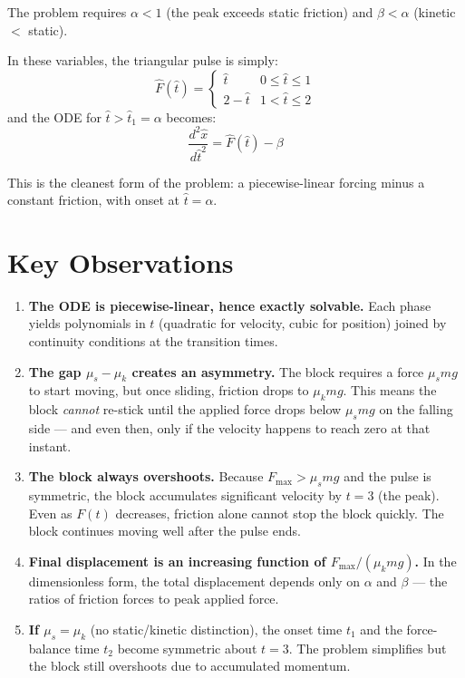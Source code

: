 \documentclass[11pt]{article}
\newcommand{\ddd}[2]{\frac{d^2 #1}{d #2^2}}
\begin{document}
\noindent
The problem requires $\alpha < 1$ (the peak exceeds static friction) and $\beta < \alpha$ (kinetic $<$ static).

\medskip
\noindent
In these variables, the triangular pulse is simply:
\begin{equation}
\hat{F}(\hat{t}) =
\begin{cases}
\hat{t} & 0 \le \hat{t} \le 1 \\
2 - \hat{t} & 1 < \hat{t} \le 2
\end{cases}
\end{equation}
and the ODE for $\hat{t} > \hat{t}_1 = \alpha$ becomes:
\begin{equation}
\boxed{\ddd{\hat{x}}{\hat{t}} = \hat{F}(\hat{t}) - \beta}
\label{eq:dimless_ode}
\end{equation}

\noindent
This is the cleanest form of the problem: a piecewise-linear forcing minus a constant friction, with onset at $\hat{t} = \alpha$.

\section{Key Observations}

\begin{enumerate}
    \item \textbf{The ODE is piecewise-linear, hence exactly solvable.}  Each phase yields polynomials in $t$ (quadratic for velocity, cubic for position) joined by continuity conditions at the transition times.

    \item \textbf{The gap $\mu_s - \mu_k$ creates an asymmetry.}  The block requires a force $\mu_s mg$ to start moving, but once sliding, friction drops to $\mu_k mg$.  This means the block \emph{cannot} re-stick until the applied force drops below $\mu_s mg$ on the falling side --- and even then, only if the velocity happens to reach zero at that instant.

    \item \textbf{The block always overshoots.}  Because $F_{\max} > \mu_s mg$ and the pulse is symmetric, the block accumulates significant velocity by $t = 3$ (the peak).  Even as $F(t)$ decreases, friction alone cannot stop the block quickly.  The block continues moving well after the pulse ends.

    \item \textbf{Final displacement is an increasing function of $F_{\max}/(\mu_k mg)$.}  In the dimensionless form, the total displacement depends only on $\alpha$ and $\beta$ --- the ratios of friction forces to peak applied force.

    \item \textbf{If $\mu_s = \mu_k$} (no static/kinetic distinction), the onset time $t_1$ and the force-balance time $t_2$ become symmetric about $t = 3$.  The problem simplifies but the block still overshoots due to accumulated momentum.
\end{enumerate}
\end{document}
